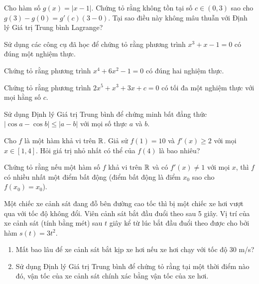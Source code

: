 \begin{exercise}
Cho hàm số $g(x) = |x-1|$. Chứng tỏ rằng không tồn tại số $c \in (0,3)$ sao cho $g(3) - g(0) = g'(c)(3-0)$. Tại sao điều này không mâu thuẫn với Định lý Giá trị Trung bình Lagrange?
\end{exercise}

\begin{exercise}
Sử dụng các công cụ đã học để chứng tỏ rằng phương trình $x^3 + x - 1 = 0$ có đúng một nghiệm thực.
\end{exercise}

\begin{exercise}
Chứng tỏ rằng phương trình $x^4 + 6x^2 - 1 = 0$ có đúng hai nghiệm thực.
\end{exercise}

\begin{exercise}
Chứng tỏ rằng phương trình $2x^5 + x^3 + 3x + c = 0$ có tối đa một nghiệm thực với mọi hằng số $c$.
\end{exercise}

\begin{exercise}
Sử dụng Định lý Giá trị Trung bình để chứng minh bất đẳng thức $|\cos a - \cos b| \le |a-b|$ với mọi số thực $a$ và $b$.
\end{exercise}

\begin{exercise}
Cho $f$ là một hàm khả vi trên $\mathbb{R}$. Giả sử $f(1) = 10$ và $f'(x) \ge 2$ với mọi $x \in [1, 4]$. Hỏi giá trị nhỏ nhất có thể của $f(4)$ là bao nhiêu?
\end{exercise}

\begin{exercise}
Chứng tỏ rằng nếu một hàm số $f$ khả vi trên $\mathbb{R}$ và có $f'(x) \neq 1$ với mọi $x$, thì $f$ có nhiều nhất một điểm bất động (điểm bất động là điểm $x_0$ sao cho $f(x_0) = x_0$).
\end{exercise}

\begin{exercise}
Một chiếc xe cảnh sát đang đỗ bên đường cao tốc thì bị một chiếc xe hơi vượt qua với tốc độ không đổi. Viên cảnh sát bắt đầu đuổi theo sau 5 giây. Vị trí của xe cảnh sát (tính bằng mét) sau $t$ giây kể từ lúc bắt đầu đuổi theo được cho bởi hàm $s(t) = 3t^2$.
\begin{enumerate}[label=(\alph*)]
    \item Mất bao lâu để xe cảnh sát bắt kịp xe hơi nếu xe hơi chạy với tốc độ 30 m/s?
    \item Sử dụng Định lý Giá trị Trung bình để chứng tỏ rằng tại một thời điểm nào đó, vận tốc của xe cảnh sát chính xác bằng vận tốc của xe hơi.
\end{enumerate}
\end{exercise}

